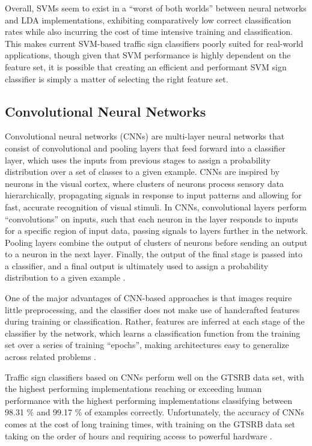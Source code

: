 \documentclass[letterpaper,twocolumn,10pt]{article}
\begin{document}
Overall, SVMs seem to exist in a ``worst of both worlds'' between neural networks and LDA implementations, exhibiting comparatively low correct classification rates while also incurring the cost of time intensive training and classification. This makes current SVM-based traffic sign classifiers poorly suited for real-world applications, though given that SVM performance is highly dependent on the feature set, it is possible that creating an efficient and performant SVM sign classifier is simply a matter of selecting the right feature set.

\subsection{Convolutional Neural Networks}

Convolutional neural networks (CNNs) are multi-layer neural networks that consist of convolutional and pooling layers that feed forward into a classifier layer, which uses the inputs from previous stages to assign a probability distribution over a set of classes to a given example. CNNs are inspired by neurons in the visual cortex, where clusters of neurons process sensory data hierarchically, propagating signals in response to input patterns and allowing for fast, accurate recognition of visual stimuli. In CNNs, convolutional layers perform ``convolutions'' on inputs, such that each neuron in the layer responds to inputs for a specific region of input data, passing signals to layers further in the network. Pooling layers combine the output of clusters of neurons before sending an output to a neuron in the next layer. Finally, the output of the final stage is passed into a classifier, and a final output is ultimately used to assign a probability distribution to a given example \cite{ciresan_committee_2011, ciresan_multi-column_2012, sermanet_convolutional_2012, sermanet_traffic_2011}. 

One of the major advantages of CNN-based approaches is that images require little preprocessing, and the classifier does not make use of handcrafted features during training or classification. Rather, features are inferred at each stage of the classifier by the network, which learns a classification function from the training set over a series of training ``epochs'', making architectures easy to generalize across related problems \cite{sermanet_convolutional_2012, sermanet_traffic_2011, stallkamp_german_2011, stallkamp_man_2012}. 

Traffic sign classifiers based on CNNs perform well on the GTSRB data set, with the highest performing implementations reaching or exceeding human performance with the highest performing implementations  classifying between 98.31 \% and 99.17 \% of examples correctly. Unfortunately, the accuracy of CNNs comes at the cost of long training times, with training on the GTSRB data set taking on the order of hours and requiring access to powerful hardware \cite{sermanet_convolutional_2012, sermanet_traffic_2011, stallkamp_german_2011, stallkamp_man_2012}. 
\end{document}

